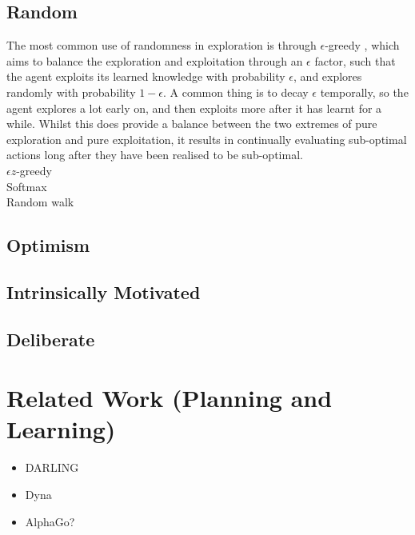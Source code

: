 \subsection{Random}
The most common use of randomness in exploration is through $\epsilon$-greedy \cite{Watkins:1989, conf/nips/Sutton95}, which aims to balance the exploration and exploitation through an $\epsilon$ factor, such that the agent exploits its learned knowledge with probability $\epsilon$, and explores randomly with probability $1-\epsilon$. A common thing is to decay $\epsilon$ temporally, so the agent explores a lot early on, and then exploits more after it has learnt for a while.
Whilst this does provide a balance between the two extremes of pure exploration and pure exploitation, it results in continually evaluating sub-optimal actions long after they have been realised to be sub-optimal.
\\$\epsilon z$-greedy \cite{dabney2021temporallyextended}
\\Softmax \cite{10.1007/978-3-642-76153-9_28}
\\Random walk \cite{anderson86, NIPS1989_17000029}
\subsection{Optimism}
\subsection{Intrinsically Motivated}
\subsection{Deliberate}


\section{Related Work (Planning and Learning)}
\begin{itemize}
    \item DARLING
    \item Dyna
    \item AlphaGo?
\end{itemize}
